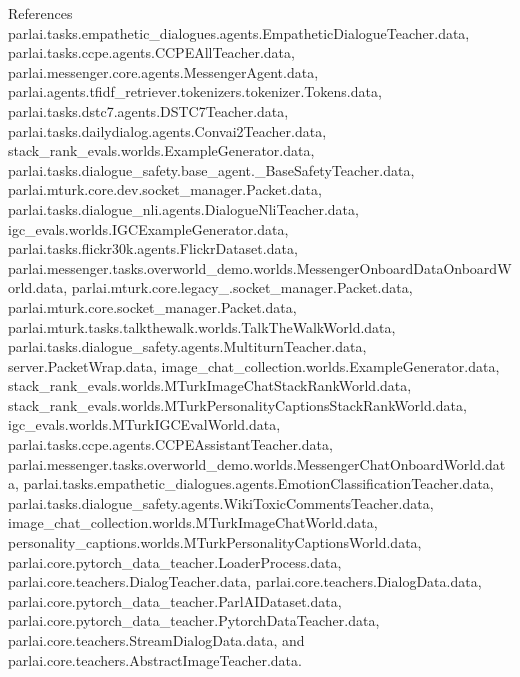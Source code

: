 References parlai.\+tasks.\+empathetic\+\_\+dialogues.\+agents.\+Empathetic\+Dialogue\+Teacher.\+data, parlai.\+tasks.\+ccpe.\+agents.\+C\+C\+P\+E\+All\+Teacher.\+data, parlai.\+messenger.\+core.\+agents.\+Messenger\+Agent.\+data, parlai.\+agents.\+tfidf\+\_\+retriever.\+tokenizers.\+tokenizer.\+Tokens.\+data, parlai.\+tasks.\+dstc7.\+agents.\+D\+S\+T\+C7\+Teacher.\+data, parlai.\+tasks.\+dailydialog.\+agents.\+Convai2\+Teacher.\+data, stack\+\_\+rank\+\_\+evals.\+worlds.\+Example\+Generator.\+data, parlai.\+tasks.\+dialogue\+\_\+safety.\+base\+\_\+agent.\+\_\+\+Base\+Safety\+Teacher.\+data, parlai.\+mturk.\+core.\+dev.\+socket\+\_\+manager.\+Packet.\+data, parlai.\+tasks.\+dialogue\+\_\+nli.\+agents.\+Dialogue\+Nli\+Teacher.\+data, igc\+\_\+evals.\+worlds.\+I\+G\+C\+Example\+Generator.\+data, parlai.\+tasks.\+flickr30k.\+agents.\+Flickr\+Dataset.\+data, parlai.\+messenger.\+tasks.\+overworld\+\_\+demo.\+worlds.\+Messenger\+Onboard\+Data\+Onboard\+World.\+data, parlai.\+mturk.\+core.\+legacy\+\_.\+socket\+\_\+manager.\+Packet.\+data, parlai.\+mturk.\+core.\+socket\+\_\+manager.\+Packet.\+data, parlai.\+mturk.\+tasks.\+talkthewalk.\+worlds.\+Talk\+The\+Walk\+World.\+data, parlai.\+tasks.\+dialogue\+\_\+safety.\+agents.\+Multiturn\+Teacher.\+data, server.\+Packet\+Wrap.\+data, image\+\_\+chat\+\_\+collection.\+worlds.\+Example\+Generator.\+data, stack\+\_\+rank\+\_\+evals.\+worlds.\+M\+Turk\+Image\+Chat\+Stack\+Rank\+World.\+data, stack\+\_\+rank\+\_\+evals.\+worlds.\+M\+Turk\+Personality\+Captions\+Stack\+Rank\+World.\+data, igc\+\_\+evals.\+worlds.\+M\+Turk\+I\+G\+C\+Eval\+World.\+data, parlai.\+tasks.\+ccpe.\+agents.\+C\+C\+P\+E\+Assistant\+Teacher.\+data, parlai.\+messenger.\+tasks.\+overworld\+\_\+demo.\+worlds.\+Messenger\+Chat\+Onboard\+World.\+data, parlai.\+tasks.\+empathetic\+\_\+dialogues.\+agents.\+Emotion\+Classification\+Teacher.\+data, parlai.\+tasks.\+dialogue\+\_\+safety.\+agents.\+Wiki\+Toxic\+Comments\+Teacher.\+data, image\+\_\+chat\+\_\+collection.\+worlds.\+M\+Turk\+Image\+Chat\+World.\+data, personality\+\_\+captions.\+worlds.\+M\+Turk\+Personality\+Captions\+World.\+data, parlai.\+core.\+pytorch\+\_\+data\+\_\+teacher.\+Loader\+Process.\+data, parlai.\+core.\+teachers.\+Dialog\+Teacher.\+data, parlai.\+core.\+teachers.\+Dialog\+Data.\+data, parlai.\+core.\+pytorch\+\_\+data\+\_\+teacher.\+Parl\+A\+I\+Dataset.\+data, parlai.\+core.\+pytorch\+\_\+data\+\_\+teacher.\+Pytorch\+Data\+Teacher.\+data, parlai.\+core.\+teachers.\+Stream\+Dialog\+Data.\+data, and parlai.\+core.\+teachers.\+Abstract\+Image\+Teacher.\+data.



